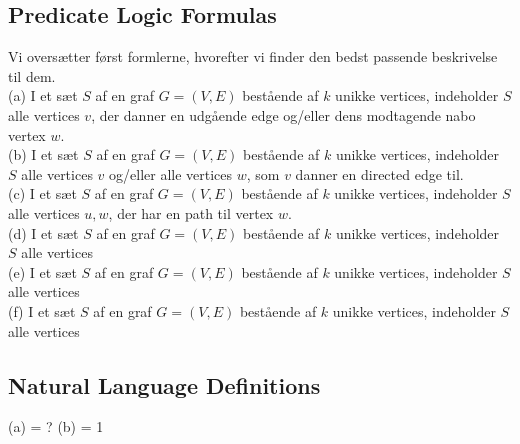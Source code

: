 \documentclass[a4paper,12pt]{article}
\begin{document}
\subsection{Predicate Logic Formulas}
Vi oversætter først formlerne, hvorefter vi finder den bedst passende beskrivelse til dem.\\

(a) I et sæt $S$ af en graf $G=(V,E)$ bestående af $k$ unikke vertices, indeholder $S$ alle vertices $v$, der danner en udgående edge og/eller dens modtagende nabo vertex $w$.\\

(b) I et sæt $S$ af en graf $G=(V,E)$ bestående af $k$ unikke vertices, indeholder $S$ alle vertices $v$ og/eller alle vertices $w$, som $v$ danner en directed edge til.\\

(c) I et sæt $S$ af en graf $G=(V,E)$ bestående af $k$ unikke vertices, indeholder $S$ alle vertices $u,w$, der har en path til vertex $w$.\\

(d) I et sæt $S$ af en graf $G=(V,E)$ bestående af $k$ unikke vertices, indeholder $S$ alle vertices\\

(e) I et sæt $S$ af en graf $G=(V,E)$ bestående af $k$ unikke vertices, indeholder $S$ alle vertices\\

(f) I et sæt $S$ af en graf $G=(V,E)$ bestående af $k$ unikke vertices, indeholder $S$ alle vertices\\

\subsection{Natural Language Definitions}
(a) = ?
(b) = 1
\end{document}
